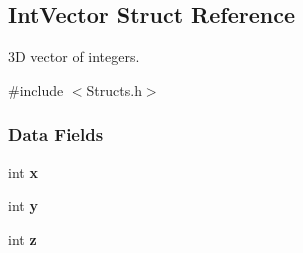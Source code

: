 \hypertarget{structIntVector}{}\subsection{Int\+Vector Struct Reference}
\label{structIntVector}


3D vector of integers.  




{\ttfamily \#include $<$Structs.\+h$>$}

\subsubsection*{Data Fields}
\begin{DoxyCompactItemize}
\item 
\mbox{\label{structIntVector_a2da50f7c9948d80f9f7843e48a4404b2}} 
int {\bfseries x}
\item 
\mbox{\label{structIntVector_a88da9e80858fb7ea262450dfe0893b99}} 
int {\bfseries y}
\item 
\mbox{\label{structIntVector_ad394fec42a49f65ad115ea71635ee1ac}} 
int {\bfseries z}
\end{DoxyCompactItemize}
